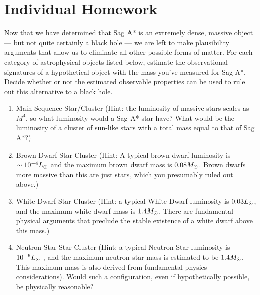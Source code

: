 \section{Individual Homework}

Now that we have determined that Sag A* is an extremely dense, massive object --- but not quite certainly a black hole --- we are left to make plausibility arguments that allow us to
eliminate all other possible forms of matter. For each category of astrophysical objects listed
below, estimate the observational signatures of a hypothetical object with the mass you’ve
measured for Sag A*. Decide whether or not the estimated observable properties can be used
to rule out this alternative to a black hole.
\begin{enumerate}
	\item Main-Sequence Star/Cluster (Hint: the luminosity of massive stars scales as $M^4$, so
	what luminosity would a Sag A*-star have? What would be the luminosity of a cluster
	of sun-like stars with a total mass equal to that of Sag A*?)
	
	\item Brown Dwarf Star Cluster (Hint: A typical brown dwarf luminosity is $\sim 10^{-4} L_\textrm{\astrosun}$ and
	the maximum brown dwarf mass is $0.08M_\textrm{\astrosun}$. Brown dwarfs more massive than this are
	just stars, which you presumably ruled out above.)
	
	\item White Dwarf Star Cluster (Hint: a typical White Dwarf luminosity is $0.03L_\textrm{\astrosun}$, and the
	maximum white dwarf mass is $1.4M_\textrm{\astrosun}$. There are fundamental physical arguments that
	preclude the stable existence of a white dwarf above this mass.)
	
	\item Neutron Star Star Cluster (Hint: a typical Neutron Star luminosity is $10^{-6} L_\textrm{\astrosun}$ , and the
	maximum neutron star mass is estimated to be $1.4M_\textrm{\astrosun}$. This maximum mass is also
	derived from fundamental physics considerations). Would such a configuration, even if
	hypothetically possible, be physically reasonable?
\end{enumerate}